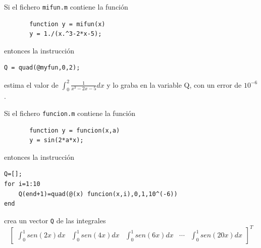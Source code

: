 \documentclass[11pt]{article}
\begin{document}
Si el fichero \texttt{mifun.m} contiene la funci\'on
\begin{lstlisting}
       function y = mifun(x)
       y = 1./(x.^3-2*x-5);
\end{lstlisting}
entonces la instrucci\'on 
\begin{lstlisting}
Q = quad(@myfun,0,2);
\end{lstlisting}
estima el valor de $\int_0^2\frac{1}{x^3-2x-5} dx$ y lo graba en la variable Q, con un error de $10^{-6}$.

Si el fichero \texttt{funcion.m} contiene la funci\'on
\begin{lstlisting}
       function y = funcion(x,a)
       y = sin(2*a*x);
\end{lstlisting}
entonces la instrucci\'on
\begin{lstlisting}
Q=[];
for i=1:10
	Q(end+1)=quad(@(x) funcion(x,i),0,1,10^(-6))
end
\end{lstlisting}
crea un vector \texttt{Q} de las integrales 
$$
\begin{bmatrix}
\int_0^1sen(2x)dx & \int_0^1sen(4x)dx & \int_0^1sen(6x)dx &  \cdots 
&\int_0^1sen(20x)dx
\end{bmatrix}^T
$$
\end{document}
